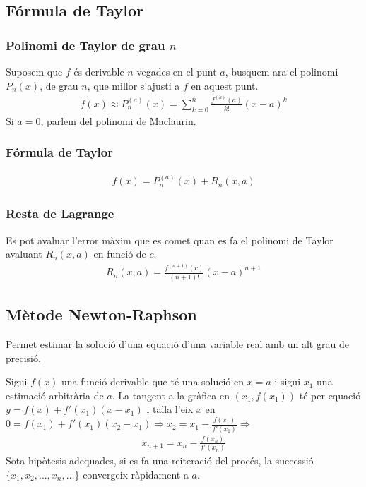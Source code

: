 \subsection{Fórmula de Taylor}
\subsubsection*{Polinomi de Taylor de grau $n$}
Suposem que $f$ és derivable $n$ vegades en el punt $a$, busquem ara el polinomi $P_{n}(x)$, de grau $n$, que millor s'ajusti a $f$ en aquest punt.
\begin{align}
    f(x) \approx P_{n}^{(a)}(x) = \sum\limits_{k=0}^{n} \frac{f^{(k)}(a)}{k!} (x-a)^{k}
\end{align}
Si $a=0$, parlem del polinomi de Maclaurin.

\subsubsection*{Fórmula de Taylor}
\begin{align}
    f(x) = P_{n}^{(a)}(x) + R_{n}(x,a)
\end{align}

\subsubsection*{Resta de Lagrange}
Es pot avaluar l'error màxim que es comet quan es fa el polinomi de Taylor avaluant $R_{n}(x,a)$ en funció de $c$.
\begin{align}
    R_{n}(x,a) = \frac{f^{(n+1)}(c)}{(n+1)!}(x-a)^{n+1}
\end{align}

\subsection{Mètode Newton-Raphson}
Permet estimar la solució d'una equació d'una variable real amb un alt grau de precisió.

Sigui $f(x)$ una funció derivable que té una solució en $x=a$ i sigui $x_{1}$ una estimació arbitrària de $a$. La tangent a la gràfica en $(x_{1}, f(x_{1}))$ té per equació $y= f(x) + f'(x_{1})(x-x_{1})$ i talla l'eix $x$ en $0=f(x_{1})+f'(x_{1})(x_{2}-x_{1}) \Rightarrow x_{2}= x_{1} - \frac{f(x_{1})}{f'(x_{1})} \Rightarrow$ 
\begin{align}
    x_{n+1}= x_{n} - \frac{f(x_{n})}{f'(x_{n})}
\end{align}
Sota hipòtesis adequades, si es fa una reiteració del procés, la successió $\{ x_{1}, x_{2}, \dots , x_{n}, \dots \}$ convergeix ràpidament a $a$.

